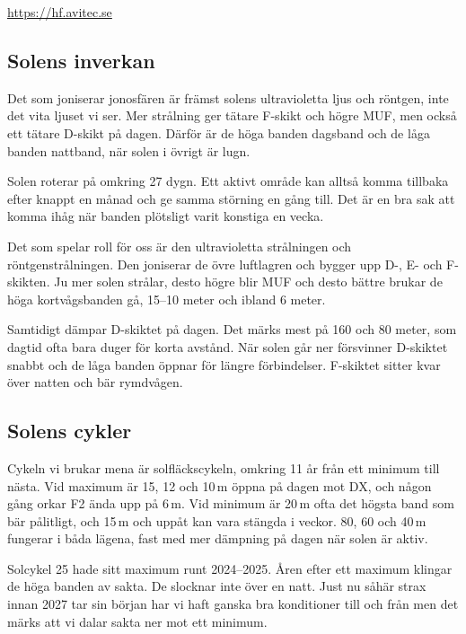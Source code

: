 \url{https://hf.avitec.se}

\subsection{Solens inverkan}

Det som joniserar jonosfären är främst solens ultravioletta ljus och
röntgen, inte det vita ljuset vi ser. Mer strålning ger tätare F-skikt
och högre MUF, men också ett tätare D-skikt på dagen. Därför är de
höga banden dagsband och de låga banden nattband, när solen i övrigt
är lugn.

Solen roterar på omkring 27 dygn. Ett aktivt område kan alltså komma
tillbaka efter knappt en månad och ge samma störning en gång till. Det
är en bra sak att komma ihåg när banden plötsligt varit konstiga en
vecka.

Det som spelar roll för oss är den ultravioletta strålningen och
röntgenstrålningen. Den joniserar de övre luftlagren och bygger upp D-, E-
och F-skikten. Ju mer solen strålar, desto högre blir MUF och desto bättre
brukar de höga kortvågsbanden gå, 15--10 meter och ibland 6 meter.

Samtidigt dämpar D-skiktet på dagen. Det märks mest på 160 och 80 meter, som
dagtid ofta bara duger för korta avstånd. När solen går ner försvinner
D-skiktet snabbt och de låga banden öppnar för längre förbindelser. F-skiktet
sitter kvar över natten och bär rymdvågen.

\subsection{Solens cykler}

Cykeln vi brukar mena är solfläckscykeln, omkring 11 år från ett
minimum till nästa. Vid maximum är 15, 12 och 10\,m öppna på dagen mot
DX, och någon gång orkar F2 ända upp på 6\,m. Vid minimum är 20\,m
ofta det högsta band som bär pålitligt, och 15\,m och uppåt kan vara
stängda i veckor.  80, 60 och 40\,m fungerar i båda lägena, fast med
mer dämpning på dagen när solen är aktiv.

Solcykel 25 hade sitt maximum runt 2024--2025. Åren efter ett maximum
klingar de höga banden av sakta. De slocknar inte över en natt. Just
nu såhär strax innan 2027 tar sin början har vi haft ganska bra
konditioner till och från men det märks att vi dalar sakta ner mot ett
minimum.

